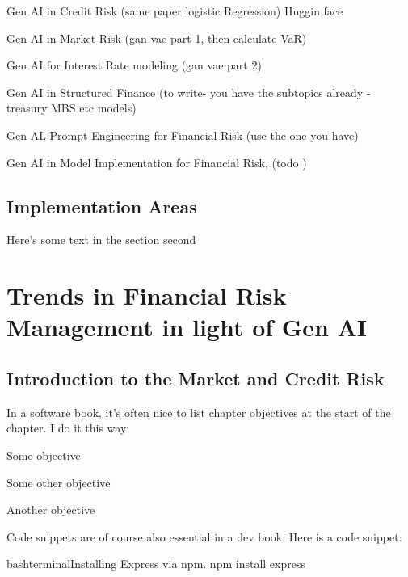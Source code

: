 \documentclass[a4paper,headinclude=on,footinclude=on,12pt,oneside]{scrbook}
\begin{document}
 
Gen AI in Credit Risk (same paper logistic Regression) Huggin face


Gen AI in Market Risk (gan vae part 1, then calculate VaR)


Gen AI for Interest Rate modeling (gan vae part 2)


Gen AI in Structured Finance (to write- you have the subtopics already - treasury MBS etc models)


Gen AL Prompt Engineering for Financial Risk (use the one you have)


Gen AI in Model Implementation for Financial Risk, (todo )


\section{Implementation Areas}

Here's some text in the section second

\chapter{Trends in Financial Risk Management in light of Gen AI}

\section{Introduction to the Market and Credit Risk}

In a software book, it's often nice to list chapter objectives at the start of the chapter. I do it this way:

\begin{arrows}
\item Some objective
\item Some other objective
\item Another objective
\end{arrows}


Code snippets are of course also essential in a dev book. Here is a code snippet:

\begin{codeInput}{bash}{terminal}{Installing Express via npm.}
npm install express
\end{codeInput}
\end{document}
